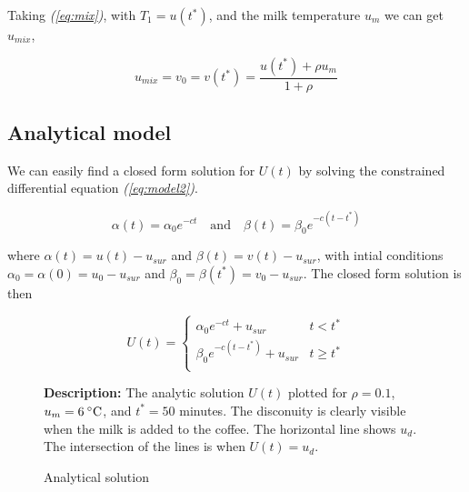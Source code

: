 \documentclass[11pt,oneside]{extarticle}
\newcommand{\Celsius}{\:\degree\mathrm{C}}
\renewcommand{\eqref}[1]{\textup{\emph{({\ref*{#1}})}}}
\numberwithin{equation}{section}
\numberwithin{figure}{section}
\begin{document}
Taking \eqref{eq:mix}, with $T_1 = u(t^*)$, and the milk temperature $u_m$ we can get $u_{mix}$,

\begin{equation}
    u_{mix} = 
    v_0 = v(t^*) =
    \frac{ u(t^*) + \rho u_m }{ 1 + \rho }
\end{equation}

\subsection{Analytical model}

We can easily find a closed form solution for $U(t)$ by solving the constrained
differential equation \eqref{eq:model2}.

\begin{equation}
    \alpha(t) = \alpha_0 e^{-ct}
    \quad\text{and}\quad
    \beta(t) = \beta_0 e^{-c(t - t^*)}
\end{equation}

where $\alpha(t) = u(t) - u_{sur}$ and $\beta(t) = v(t) - u_{sur}$, with intial
conditions $\alpha_0 = \alpha(0) = u_0 - u_{sur}$ and $\beta_0 = \beta(t^*) =
v_0 - u_{sur}$. The closed form solution is then

\begin{equation}
    \label{eq:model2-analytic}
    U(t) =
    \begin{cases}
        \alpha_0e^{-ct} + u_{sur}   &   t < t^* \\
        \beta_0e^{-c(t-t^*)} + u_{sur}  & t \geq t^* \\
    \end{cases}
\end{equation}


\begin{figure}[H]
    \caption{Analytical solution}
    \label{fig:analytic}
    \begin{center}
        {\graphicspath{{./figures/}}
        } 
        
        \scriptsize{ {\bf Description:} The analytic solution $U(t)$ plotted for $\rho = 0.1$,
        $u_{m} = 6\Celsius$, and $t^* = 50$ minutes. The disconuity is clearly visible when
        the milk is added to the coffee. The horizontal line shows $u_d$. The intersection
        of the lines is when $U(t)=u_d$.}
    \end{center}
\end{figure}

\newpage
\end{document}

